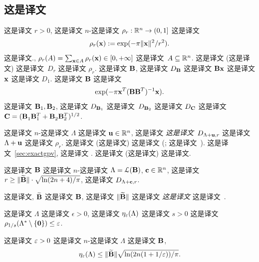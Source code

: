 \subsection{这是译文}
\label{sec:gaussian_measures}


这是译文 $r > 0$, 这是译文 $n$-这是译文 $\rho_r : \mathbb{R}^{n} \to (0,1]$ 这是译文 \[ \rho_r(\mathbf{x}) := \exp(-\pi
\lVert\mathbf{x}\rVert^{2}/r^2).
\] 这是译文., $\rho_r(A) = \sum_{\mathbf{x} \in A} \rho_r(\mathbf{x}) 
\in [0,+\infty]$ 这是译文~$A \subseteq \mathbb{R}^{n}$. 这是译文 (这是译文) 这是译文~$D_r$ 这是译文 $\rho_r$. 这是译文 $\mathbf{B}$, 这是译文 $D_{\mathbf{B}}$ 这是译文 $\mathbf{B} \mathbf{x}$ 这是译文 $\mathbf{x}$ 这是译文 $D_1$. 这是译文 $\mathbf{B}$ 这是译文 \[
\exp(-\pi \mathbf{x}^T (\mathbf{B} \mathbf{B}^T)^{-1} \mathbf{x}).
\] 这是译文 $\mathbf{B}_1,\mathbf{B}_2$, 这是译文 $D_{\mathbf{B}_1}$ 这是译文~$D_{\mathbf{B}_2}$ 这是译文 $D_{\mathbf{C}}$ 这是译文 $\mathbf{C} = (\mathbf{B}_1^{} \mathbf{B}_1^T + \mathbf{B}_2^{} \mathbf{B}_2^T)^{1/2}$.

这是译文 $n$-这是译文 $\Lambda$ 这是译文 $\mathbf{u} \in \mathbb{R}^n$, 这是译文 \emph{这是译文}~$D_{\Lambda+\mathbf{u},r}$ 这是译文 $\Lambda+\mathbf{u}$ 这是译文 $\rho_r$. 这是译文 (这是译文) 这是译文  (\cite[Theorem~4.1]{DBLP:conf/stoc/GentryPV08}; 这是译文~\cite{DBLP:conf/crypto/Peikert10}). 这是译文~\ref{sec:exactgpv}, 这是译文 \cite{DBLP:conf/stoc/GentryPV08}. 这是译文 (这是译文) 这是译文.

\begin{lemma}\label{lem:gpv} 这是译文 $\mathbf{B}$ 这是译文 $n$-这是译文 $\Lambda = \mathcal{L}(\mathbf{B})$, $\mathbf{c} \in \mathbb{R}^n$, 这是译文 $r \ge \|\widetilde {\mathbf{B}}\| \cdot \sqrt{\ln(2n+4)/\pi}$, 这是译文 $D_{\Lambda+\mathbf{c},r}$. 
\end{lemma}

这是译文, $\widetilde {\mathbf{B}}$ 这是译文 $\mathbf{B}$, 这是译文 $\|\widetilde {\mathbf{B}}\|$ 这是译文 \emph{这是译文} 这是译文~\cite{DBLP:journals/siamcomp/MicciancioR07}.

\begin{definition}
  \label{def:smoothing}  这是译文 $\Lambda$ 这是译文 $\epsilon > 0$, 这是译文 $\eta_{\varepsilon}(\Lambda)$ 这是译文 $s >
  0$ 这是译文 $\rho_{1/s}(\Lambda^* \setminus \{\mathbf{0}\}) \leq
  \varepsilon$.
\end{definition}

\begin{lemma}\label{lem:boundonsmoothing} 这是译文 $\varepsilon>0$ 这是译文 $n$-这是译文 $\Lambda$ 这是译文 $\mathbf{B}$, \[
\eta_{\varepsilon}(\Lambda) \le \|\widetilde {\mathbf{B}} \| \sqrt{\ln(2n(1+1/\varepsilon))/\pi}.
\]
\end{lemma}


